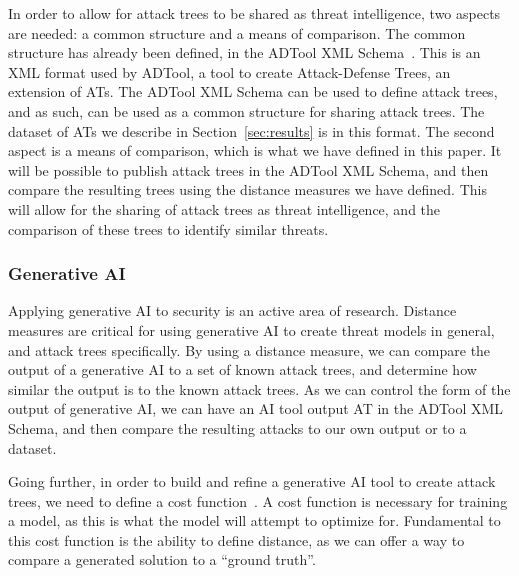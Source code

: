 In order to allow for attack trees to be shared as threat intelligence, two aspects are needed: a common structure and a means of comparison. The common structure has already been defined, in the ADTool XML Schema~\cite{kordy_adtool_2013}. This is an XML format used by ADTool, a tool to create Attack-Defense Trees, an extension of ATs. The ADTool XML Schema can be used to define attack trees, and as such, can be used as a common structure for sharing attack trees. The dataset of ATs we describe in Section~\ref{sec:results} is in this format. The second aspect is a means of comparison, which is what we have defined in this paper. It will be possible to publish attack trees in the ADTool XML Schema, and then compare the resulting trees using the distance measures we have defined. This will allow for the sharing of attack trees as threat intelligence, and the comparison of these trees to identify similar threats.

\subsubsection{Generative AI}

Applying generative AI to security is an active area of research. Distance measures are critical for using generative AI to create threat models in general, and attack trees specifically. By using a distance measure, we can compare the output of a generative AI to a set of known attack trees, and determine how similar the output is to the known attack trees. As we can control the form of the output of generative AI, we can have an AI tool output AT in the ADTool XML Schema, and then compare the resulting attacks to our own output or to a dataset.

Going further, in order to build and refine a generative AI tool to create attack trees, we need to define a cost function~. A cost function is necessary for training a model, as this is what the model will attempt to optimize for. Fundamental to this cost function is the ability to define distance, as we can offer a way to compare a generated solution to a ``ground truth''.

